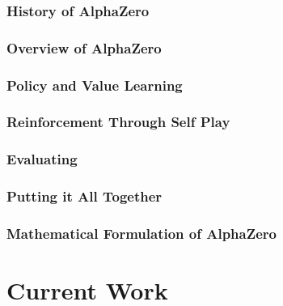 \documentclass{beamer}
\begin{document}

\begin{frame}
\frametitle{History of AlphaZero}
\end{frame}



\begin{frame}
\frametitle{Overview of AlphaZero}
\end{frame}



\begin{frame}
\frametitle{Policy and Value Learning}
\end{frame}



\begin{frame}
\frametitle{Reinforcement Through Self Play}
\end{frame}



\begin{frame}
\frametitle{Evaluating}
\end{frame}



\begin{frame}
\frametitle{Putting it All Together}
\end{frame}



\begin{frame}
\frametitle{Mathematical Formulation of AlphaZero}
\end{frame}


\section{Current Work}
\end{document}
